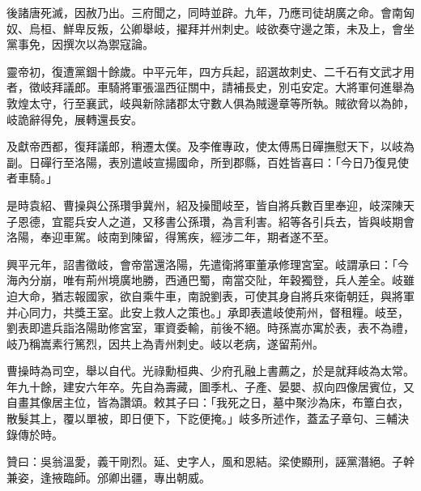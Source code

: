 \begin{pinyinscope}
後諸唐死滅，因赦乃出。三府聞之，同時並辟。九年，乃應司徒胡廣之命。會南匈奴、烏桓、鮮卑反叛，公卿舉岐，擢拜并州刺史。岐欲奏守邊之策，未及上，會坐黨事免，因撰次以為禦寇論。

靈帝初，復遭黨錮十餘歲。中平元年，四方兵起，詔選故刺史、二千石有文武才用者，徵岐拜議郎。車騎將軍張溫西征關中，請補長史，別屯安定。大將軍何進舉為敦煌太守，行至襄武，岐與新除諸郡太守數人俱為賊邊章等所執。賊欲脅以為帥，岐詭辭得免，展轉還長安。

及獻帝西都，復拜議郎，稍遷太僕。及李傕專政，使太傅馬日磾撫慰天下，以岐為副。日磾行至洛陽，表別遣岐宣揚國命，所到郡縣，百姓皆喜曰：「今日乃復見使者車騎。」

是時袁紹、曹操與公孫瓚爭冀州，紹及操聞岐至，皆自將兵數百里奉迎，岐深陳天子恩德，宜罷兵安人之道，又移書公孫瓚，為言利害。紹等各引兵去，皆與岐期會洛陽，奉迎車駕。岐南到陳留，得篤疾，經涉二年，期者遂不至。

興平元年，詔書徵岐，會帝當還洛陽，先遣衛將軍董承修理宮室。岐謂承曰：「今海內分崩，唯有荊州境廣地勝，西通巴蜀，南當交阯，年穀獨登，兵人差全。岐雖迫大命，猶志報國家，欲自乘牛車，南說劉表，可使其身自將兵來衛朝廷，與將軍并心同力，共獎王室。此安上救人之策也。」承即表遣岐使荊州，督租糧。岐至，劉表即遣兵詣洛陽助修宮室，軍資委輸，前後不絕。時孫嵩亦寓於表，表不為禮，岐乃稱嵩素行篤烈，因共上為青州刺史。岐以老病，遂留荊州。

曹操時為司空，舉以自代。光祿勳桓典、少府孔融上書薦之，於是就拜岐為太常。年九十餘，建安六年卒。先自為壽藏，圖季札、子產、晏嬰、叔向四像居賓位，又自畫其像居主位，皆為讚頌。敕其子曰：「我死之日，墓中聚沙為床，布簟白衣，散髮其上，覆以單被，即日便下，下訖便掩。」岐多所述作，蓋孟子章句、三輔決錄傳於時。

贊曰：吳翁溫愛，義干剛烈。延、史字人，風和恩結。梁使顯刑，誣黨潛絕。子幹兼姿，逢掖臨師。邠卿出疆，專出朝威。


\end{pinyinscope}